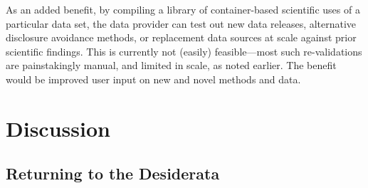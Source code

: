 \documentclass[inline]{hdsr}
\begin{document}
As an added benefit, by compiling a library of container-based scientific uses of a particular data set, the data provider can test out new data releases, alternative disclosure avoidance methods, or replacement data sources  at scale against prior scientific findings. This is currently not (easily) feasible---most such re-validations are painstakingly manual, and limited in scale, as noted earlier. The benefit would be improved user input on new and novel methods and data.


\section{Discussion}



\subsection{Returning to the Desiderata}
\end{document}
